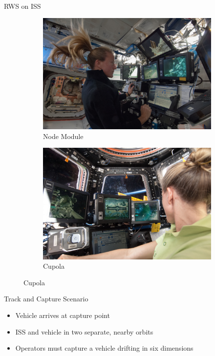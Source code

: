 \documentclass[10pt]{beamer}
\begin{document}
\begin{frame}[fragile]{RWS on ISS}
  \begin{figure}
    \begin{center}
      \begin{subfigure}{0.49\textwidth}
        \includegraphics[width=\linewidth]{../img/iss036e017589.JPG}
        \caption{Node Module}
      \end{subfigure}\hfill
      \begin{subfigure}{0.49\textwidth}
        \includegraphics[width=\linewidth]{../img/iss036e029229.JPG}
        \caption{Cupola}
      \end{subfigure}
    \end{center}
  \end{figure}
\end{frame}

\begin{frame}[fragile]{Track and Capture Scenario}
  \begin{itemize}
    \setlength\itemsep{1em}
    \item Vehicle arrives at capture point
    \item ISS and vehicle in two separate, nearby orbits
    \item Operators must capture a vehicle drifting in six dimensions
  \end{itemize}
\end{frame}
\end{document}
